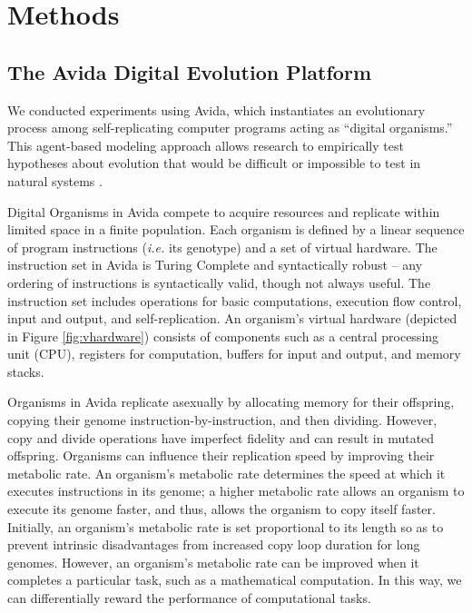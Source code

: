 \section{Methods} \label{sec:methods}

\subsection{The Avida Digital Evolution Platform}

We conducted experiments using Avida, which instantiates an evolutionary process among self-replicating computer programs acting as ``digital organisms.''
This agent-based modeling approach allows research to empirically test hypotheses about evolution that would be difficult or impossible to test in natural systems \citep{Ofria:2009avida}.



Digital Organisms in Avida compete to acquire resources and replicate within limited space in a finite population.
Each organism is defined by a linear sequence of program instructions (\textit{i.e.} its genotype) and a set of virtual hardware. The instruction set in Avida is Turing Complete and syntactically robust -- any ordering of instructions is syntactically valid, though not always useful. The instruction set includes operations for basic computations, execution flow control, input and output, and self-replication. An organism's virtual hardware (depicted in Figure \ref{fig:vhardware}) consists of components such as a central processing unit (CPU), registers for computation, buffers for input and output, and memory stacks.

Organisms in Avida replicate asexually by allocating memory for their offspring, copying their genome instruction-by-instruction, and then dividing. However, copy and divide operations have imperfect fidelity and can result in mutated offspring. Organisms can influence their replication speed by improving their metabolic rate. An organism's metabolic rate determines the speed at which it executes instructions in its genome; a higher metabolic rate allows an organism to execute its genome faster, and thus, allows the organism to copy itself faster. Initially, an organism's metabolic rate is set proportional to its length so as to prevent intrinsic disadvantages from increased copy loop duration for long genomes. However, an organism's metabolic rate can be improved when it completes a particular task, such as a mathematical computation. In this way, we can differentially reward the performance of computational tasks.

